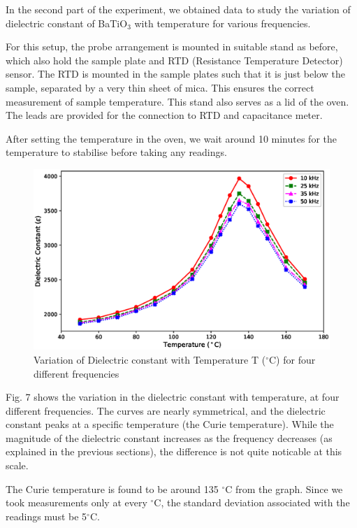 In the second part of the experiment, we obtained
data to study the variation of dielectric constant
of BaTiO$_3$ with temperature for various frequencies.

For this setup, the probe arrangement is
mounted in suitable stand as before, which also hold the sample plate and RTD (Resistance Temperature Detector) sensor. The RTD is mounted in the sample plates such that it is just below the sample, separated by a very thin sheet of mica. This ensures the correct measurement of sample temperature. This stand also
serves as a lid of the oven. The leads are provided for the connection to RTD and capacitance meter. 

After setting the temperature in the oven, we wait around 10 minutes for the temperature to stabilise before taking any readings.

	
	
	
	
	\begin{figure}
		\centering
		\includegraphics[width=1.5\columnwidth]{images/temp.eps}
		\caption{Variation of Dielectric constant with Temperature T ($^\circ$C) for four different frequencies}
		\label{graph:5}
	\end{figure}

	Fig. 7 shows the variation in the dielectric constant with temperature, at four different frequencies. The curves are nearly symmetrical, and the dielectric constant peaks at a specific temperature (the Curie temperature). While the magnitude of the dielectric constant increases as the frequency decreases (as explained in the previous sections), the difference is not quite noticable at this scale.
	
	The Curie temperature is found to be around 135 $^\circ$C from the graph. Since we took measurements only at every $^\circ$C, the standard deviation associated with the readings must be 5$^\circ$C.  
	
